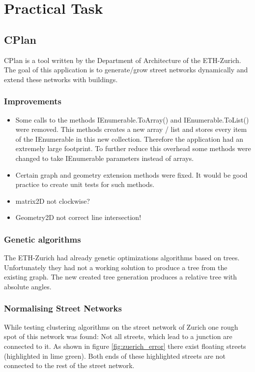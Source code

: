 \documentclass[11pt, a4paper]{report}
\begin{document}
\pagebreak
\chapter{Practical Task}
\section{CPlan}\label{CPlan}
CPlan is a tool written by the Department of Architecture of the ETH-Zurich. The goal of this application is to generate/grow street networks dynamically and extend these networks with buildings. 
\subsection{Improvements}
\begin{itemize}
    \item Some calls to the methods IEnumerable.ToArray() and IEnumerable.ToList() were removed. This methods creates a new array / list and stores every item of the IEnumerable in this new collection. Therefore the application had an extremely large footprint. To further reduce this overhead some methods were changed to take IEnumerable parameters instead of arrays.
    \item Certain graph and geometry extension methods were fixed. It would be good practice to create unit tests for such methods.
    \item matrix2D not clockwise?
    \item Geometry2D not correct line intersection!
\end{itemize}

\subsection{Genetic algorithms}
The ETH-Zurich had already genetic optimizations algorithms based on trees. Unfortunately they had not a working solution to produce a tree from the existing graph. The new created tree generation produces a relative tree with absolute angles.

\subsection{Normalising Street Networks}
While testing clustering algorithms on the street network of Zurich one rough spot of this network was found: Not all streets, which lead to a junction are connected to it. As shown in figure \ref{fig:zuerich_error} there exist floating streets (highlighted in lime green). Both ends of these highlighted streets are not connected to the rest of the street network.
\end{document}

